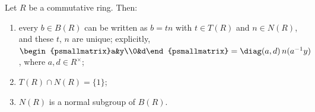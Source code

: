 Let $R$ be a commutative ring. Then:
\begin{enumerate}[label=(\roman*)]
\item every $b\in B(R)$ can be written as $b=tn$ with $t\in T(R)$ and $n\in N(R)$, and these $t$, $n$ are unique;
  explicitly, $\begin{psmallmatrix}a&y\\0&d\end{psmallmatrix}=\diag(a,d)\,n(a^{-1}y)$, where $a,d\in R^\times$;
\item $T(R)\cap N(R)=\{1\}$;
\item $N(R)$ is a normal subgroup of $B(R)$.
\end{enumerate}

